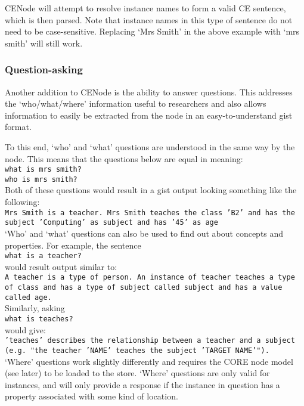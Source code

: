 \documentclass{article}
\begin{document}
CENode will attempt to resolve instance names to form a valid CE sentence, which is then parsed. Note that instance names in this type of sentence do not need to be case-sensitive. Replacing `Mrs Smith' in the above example with `mrs smith' will still work.\\

\subsubsection{Question-asking}

Another addition to CENode is the ability to answer questions. This addresses the `who/what/where' information useful to researchers and also allows information to easily be extracted from the node in an easy-to-understand gist format.

To this end, `who' and `what' questions are understood in the same way by the node. This means that the questions below are equal in meaning:\\
\texttt{what is mrs smith?}\\
\texttt{who is mrs smith?}\\

Both of these questions would result in a gist output looking something like the following:\\
\texttt{Mrs Smith is a teacher. Mrs Smith teaches the class 'B2' and has the subject 'Computing' as subject and has '45' as age}\\

`Who' and `what' questions can also be used to find out about concepts and properties. For example, the sentence\\
\texttt{what is a teacher?}\\
would result output similar to:\\
\texttt{A teacher is a type of person. An instance of teacher teaches a type of class and has a type of subject called subject and has a value called age.}\\

Similarly, asking\\
\texttt{what is teaches?}\\
would give:\\
\texttt{'teaches' describes the relationship between a teacher and a subject (e.g. "the teacher 'NAME' teaches the subject 'TARGET NAME'").}\\

`Where' questions work slightly differently and requires the CORE node model (see later) to be loaded to the store. `Where' questions are only valid for instances, and will only provide a response if the instance in question has a property associated with some kind of location.
\end{document}
